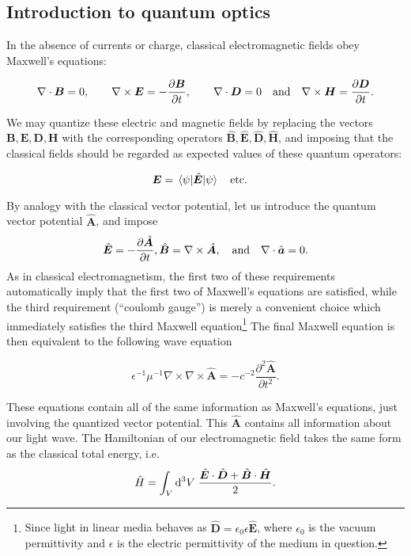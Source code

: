 \FloatBarrier
\subsection{Introduction to quantum optics}

In the absence of currents or charge, classical electromagnetic fields obey Maxwell's equations:

\begin{equation}
\nabla \cdot \bm{B} =0,\qq{} \nabla \times \bm{E} = - \frac{\partial \bm{B}}{\partial t},\qq{} \nabla \cdot \bm{D} = 0 \qq{and} \nabla \times \bm{H} = \frac{\partial \bm{D}}{\partial t}.
\end{equation}

\noindent We may quantize these electric and magnetic fields by replacing the vectors $\bm{B}, \bm{E}, \bm{D}, \bm{H}$ with the corresponding operators $\hat{\bm{B}}, \hat{\bm{E}}, \hat{\bm{D}}, \hat{\bm{H}}$, and imposing that the classical fields should be regarded as expected values of these quantum operators:

\begin{equation}
\bm{E} = \ev{\hat{\bm{E}}}{\psi} \qq{etc.}
\end{equation}

\noindent By analogy with the classical vector potential, let us introduce the quantum vector potential $\hat{\bm{A}}$, and impose
\begin{equation}
\hat{\bm{E}} = - \frac{\partial \hat{\bm{A}}}{\partial t},  \hat{\bm{B}} = \nabla \times \hat{\bm{A}}, \qq{and} \nabla \cdot \hat{\bm{a}} = 0.
\end{equation}
As in classical electromagnetism, the first two of these requirements automatically imply that the first two of Maxwell's equations are satisfied, while the third requirement (``coulomb gauge'') is merely a convenient choice which immediately satisfies the third Maxwell equation\footnote{Since light in linear media behaves as $\hat{\bm{D}} = \epsilon_0 \epsilon \hat{\bm{E}}$, where $\epsilon_0$ is the vacuum permittivity and $\epsilon$ is the electric permittivity of the medium in question.} The final Maxwell equation is then equivalent to the following wave equation

\begin{equation}
\epsilon^{-1} \mu^{-1} \nabla \times \nabla \times \hat{\bm{A}} = - c^{-2} \frac{\partial^2 \hat{\bm{A}}}{\partial t^2}.
\end{equation}

\noindent These equations contain all of the same information as Maxwell's equations, just involving the quantized vector potential. This $\hat{\bm{A}}$ contains all information about our light wave. The Hamiltonian of our electromagnetic field takes the same form as the classical total energy, i.e.
\begin{equation}\label{eqn:intro_hamiltonian}
\hat{H} = \int_V \mathop{}\!\mathrm{d^3} V \; \frac{\hat{\bm{E}} \cdot \hat{\bm{D}} + \hat{\bm{B}} \cdot \hat{\bm{H}}}{2}.
\end{equation}


